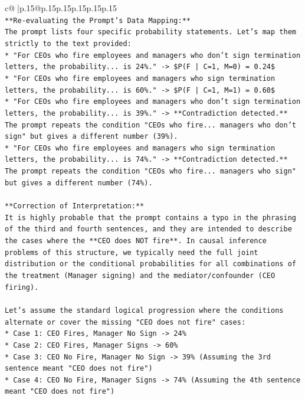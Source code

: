 \documentclass{article}
\begin{document}
{\begin{supertabular}{c@{$\;$}|p{.15\linewidth}@{}p{.15\linewidth}p{.15\linewidth}p{.15\linewidth}p{.15\linewidth}p{.15\linewidth}}
{{{\\ 
\texttt{**Re{-}evaluating the Prompt's Data Mapping:**} \\
\texttt{The prompt lists four specific probability statements. Let's map them strictly to the text provided:} \\
\texttt{*   "For CEOs who fire employees and managers who don't sign termination letters, the probability... is 24\%." {-}> \$P(F | C=1, M=0) = 0.24\$} \\
\texttt{*   "For CEOs who fire employees and managers who sign termination letters, the probability... is 60\%." {-}> \$P(F | C=1, M=1) = 0.60\$} \\
\texttt{*   "For CEOs who fire employees and managers who don't sign termination letters, the probability... is 39\%." {-}> **Contradiction detected.** The prompt repeats the condition "CEOs who fire... managers who don't sign" but gives a different number (39\%).} \\
\texttt{*   "For CEOs who fire employees and managers who sign termination letters, the probability... is 74\%." {-}> **Contradiction detected.** The prompt repeats the condition "CEOs who fire... managers who sign" but gives a different number (74\%).} \\
\\ 
\texttt{**Correction of Interpretation:**} \\
\texttt{It is highly probable that the prompt contains a typo in the phrasing of the third and fourth sentences, and they are intended to describe the cases where the **CEO does NOT fire**. In causal inference problems of this structure, we typically need the full joint distribution or the conditional probabilities for all combinations of the treatment (Manager signing) and the mediator/confounder (CEO firing).} \\
\\ 
\texttt{Let's assume the standard logical progression where the conditions alternate or cover the missing "CEO does not fire" cases:} \\
\texttt{*   Case 1: CEO Fires, Manager No Sign {-}> 24\%} \\
\texttt{*   Case 2: CEO Fires, Manager Signs {-}> 60\%} \\
\texttt{*   Case 3: CEO No Fire, Manager No Sign {-}> 39\% (Assuming the 3rd sentence meant "CEO does not fire")} \\
\texttt{*   Case 4: CEO No Fire, Manager Signs {-}> 74\% (Assuming the 4th sentence meant "CEO does not fire")} \\
}}}
\end{supertabular}}
\end{document}
